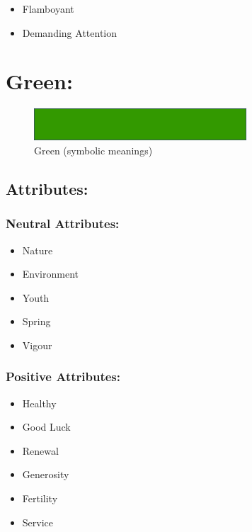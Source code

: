 \documentclass[openleft,oneside,showtrims]{memoir}
\begin{document}
\begin{itemize}
\item Flamboyant
\item Demanding Attention
\end{itemize}

\section{Green:}
\label{sec:org2559226}

\begin{figure}[htbp]
\centering
\includegraphics[width=300px]{./media/green-banner.png}
\caption{\label{fig:HAP-WR-011}Green (symbolic meanings)}
\end{figure}

\subsection{Attributes:}
\label{sec:org7f1a85c}

\subsubsection*{Neutral Attributes:}
\label{sec:orgf49ce2c}

\begin{itemize}
\item Nature
\item Environment
\item Youth
\item Spring
\item Vigour
\end{itemize}

\subsubsection*{Positive Attributes:}
\label{sec:org9242831}

\begin{itemize}
\item Healthy
\item Good Luck
\item Renewal
\item Generosity
\item Fertility
\item Service
\end{itemize}
\end{document}
